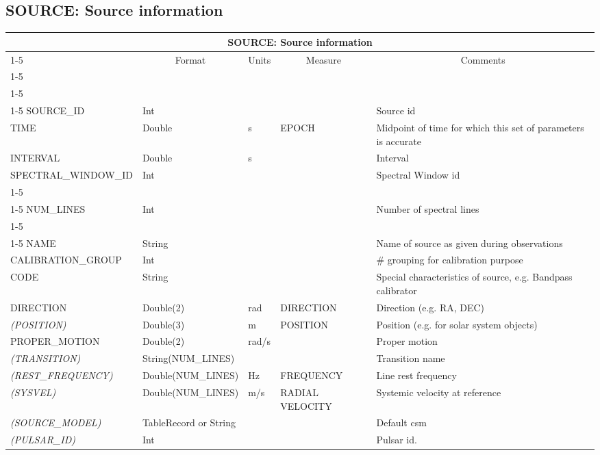 \documentclass{article}
\newcommand{\defline}[1]{\cline{1-5}
\multicolumn{5}{|l|}{#1} \\
\cline{1-5}}
\newcommand{\definetable}[2]
{
	\vfill\newpage
	\subsection{#1}
        \vspace{0.15in}
        \small
	\begin{tabular}{|l|p{1.25in}|l|p{.9in}|p{1.4in}|}
	\hline
	\multicolumn{5}{|c|}{\bf #1}\\ 
	\cline{1-5}
        \multicolumn{1}{|c|}{Name}&\multicolumn{1}{|c|}{Format}&
        \multicolumn{1}{|c|}{Units}&\multicolumn{1}{|c|}{Measure}&
        \multicolumn{1}{|c|}{Comments}\\
        \cline{1-5}
        #2
        \hline
	\end{tabular}
}
\begin{document}
\definetable{SOURCE: Source information}{
\defline{\bf Columns}
\defline{\em Key}
SOURCE\_ID &      Int &    &      & Source id\\
TIME &   Double & s  &   EPOCH  & Midpoint of time for which this set of parameters is accurate\\
INTERVAL &       Double & s &               & Interval\\
SPECTRAL\_WINDOW\_ID &   Int &    &      & Spectral Window id\\
\defline{\em Data description}
NUM\_LINES &  Int & & & Number of spectral lines\\
\defline{\em Data}  
NAME &       String &    &      & Name of source as given during observations\\
CALIBRATION\_GROUP &      Int &    &      & \# grouping for calibration purpose\\
CODE &       String &    &      & Special characteristics of source, e.g. Bandpass calibrator\\
DIRECTION &       Double(2) &  rad  &    DIRECTION &        Direction (e.g. RA, DEC) \\
{\it (POSITION)}  & Double(3) &   m  & POSITION & Position (e.g. for solar system objects) \\
PROPER\_MOTION &  Double(2) &  rad/s & &  Proper motion \\
{\it (TRANSITION)} & String(NUM\_LINES) & & & Transition name\\
{\it (REST\_FREQUENCY)} & Double(NUM\_LINES) & Hz & FREQUENCY & Line rest frequency\\
{\it (SYSVEL)}   & Double(NUM\_LINES)  &  m/s  & RADIAL VELOCITY & Systemic velocity at reference \\
{\it (SOURCE\_MODEL)} & TableRecord or String & & & Default csm \\
{\it (PULSAR\_ID)} & Int & & & Pulsar id. \\
}
\end{document}
